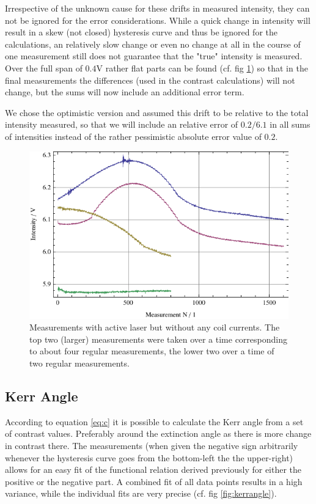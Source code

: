\documentclass[a4paper]{scrartcl}
\numberwithin{equation}{section}
\numberwithin{figure}{section}
\numberwithin{table}{section}
\begin{document}
Irrespective of the unknown cause for these drifts in measured intensity, they can not be ignored for the error considerations. While a quick change in intensity will result in a skew (not closed) hysteresis curve and thus be ignored for the calculations, an relatively slow change or even no change at all in the course of one measurement still does not guarantee that the "true" intensity is measured. Over the full span of $0.4$V rather flat parts can be found (cf. fig \ref{fig:waal}) so that in the final measurements the differences (used in the contrast calculations) will not change, but the sums will now include an additional error term.%

We chose the optimistic version and assumed this drift to be relative to the total intensity measured, so that we will include an relative error of $0.2/6.1$ in all sums of intensities instead of the rather pessimistic absolute error value of $0.2$.
\begin{figure} 
 \centering
         \includegraphics[width=0.45\linewidth]{img/drift.pdf}
\caption{
\small Measurements with active laser but without any coil currents. The top two (larger) measurements were taken over a time corresponding to about four regular measurements, the lower two over a time of two regular measurements. } 
	\label{fig:waal}
\end{figure}


\subsection{Kerr Angle}
According to equation \ref{eq:c} it is possible to calculate the Kerr angle from a set of contrast values. Preferably around the extinction angle as there is more change in contrast there. The measurements (when given the negative sign arbitrarily whenever the hysteresis curve goes from the bottom-left the the upper-right) allows for an easy fit of the functional relation derived previously for either the positive or the negative part. A combined fit of all data points results in a high variance, while the individual fits are very precise (cf. fig \ref{fig:kerrangle}).
\end{document}
